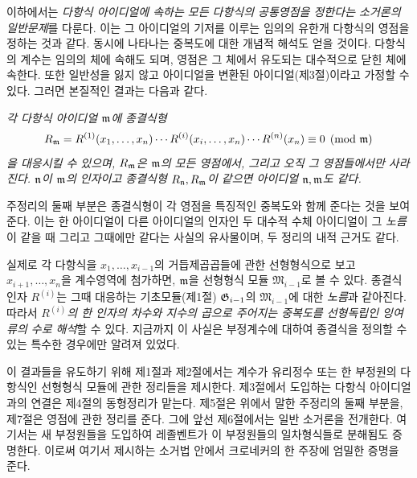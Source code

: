 이하에서는 \emph{다항식 아이디얼에 속하는 모든 다항식의 공통영점을 정한다는 소거론의 일반문제}를 다룬다. 이는 그 아이디얼의 기저를 이루는 임의의 유한개 다항식의 영점을 정하는 것과 같다. 동시에 나타나는 중복도에 대한 개념적 해석도 얻을 것이다. 다항식의 계수는 임의의 체에 속해도 되며, 영점은 그 체에서 유도되는 대수적으로 닫힌 체에 속한다. 또한 일반성을 잃지 않고 아이디얼을 변환된 아이디얼(제3절)이라고 가정할 수 있다. 그러면 본질적인 결과는 다음과 같다.

\emph{각 다항식 아이디얼 \(\mathfrak m\)에 종결식형
\[
R_{\mathfrak m}
=R^{(1)}(x_1,\ldots,x_n)\cdots
R^{(i)}(x_i,\ldots,x_n)\cdots R^{(n)}(x_n)
\equiv0\pmod{\mathfrak m}
\]
을 대응시킬 수 있으며, \(R_{\mathfrak m}\)은 \(\mathfrak m\)의 모든 영점에서, 그리고 오직 그 영점들에서만 사라진다. \(\mathfrak n\)이 \(\mathfrak m\)의 인자이고 종결식형 \(R_{\mathfrak n},R_{\mathfrak m}\)이 같으면 아이디얼 \(\mathfrak n,\mathfrak m\)도 같다.}

주정리의 둘째 부분은 종결식형이 각 영점을 특징적인 중복도와 함께 준다는 것을 보여 준다. 이는 한 아이디얼이 다른 아이디얼의 인자인 두 대수적 수체 아이디얼이 그 \emph{노름}이 같을 때 그리고 그때에만 같다는 사실의 유사물이며, 두 정리의 내적 근거도 같다.

실제로 각 다항식을 \(x_1,\ldots,x_{i-1}\)의 거듭제곱곱들에 관한 선형형식으로 보고 \(x_{i+1},\ldots,x_n\)을 계수영역에 첨가하면, \(\mathfrak m\)을 선형형식 모듈 \(\mathfrak M_{i-1}\)로 볼 수 있다. 종결식인자 \(R^{(i)}\)는 그때 대응하는 기초모듈(제1절) \(\mathfrak G_{i-1}\)의 \(\mathfrak M_{i-1}\)에 대한 \emph{노름}과 같아진다. 따라서 \emph{\(R^{(i)}\)의 한 인자의 차수와 지수의 곱으로 주어지는 중복도를 선형독립인 잉여류의 수로 해석}할 수 있다. 지금까지 이 사실은 부정계수에 대하여 종결식을 정의할 수 있는 특수한 경우에만 알려져 있었다.

이 결과들을 유도하기 위해 제1절과 제2절에서는 계수가 유리정수 또는 한 부정원의 다항식인 선형형식 모듈에 관한 정리들을 제시한다. 제3절에서 도입하는 다항식 아이디얼과의 연결은 제4절의 동형정리가 맡는다. 제5절은 위에서 말한 주정리의 둘째 부분을, 제7절은 영점에 관한 정리를 준다. 그에 앞선 제6절에서는 일반 소거론을 전개한다. 여기서는 새 부정원들을 도입하여 레졸벤트가 이 부정원들의 일차형식들로 분해됨도 증명한다. 이로써 여기서 제시하는 소거법 안에서 크로네커의 한 주장에 엄밀한 증명을 준다.

